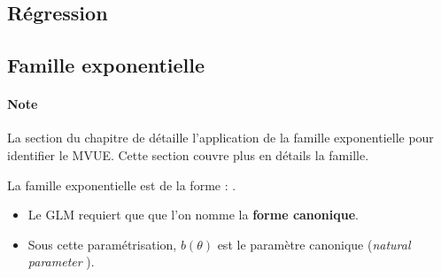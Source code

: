 \documentclass[10pt, french]{article}
\begin{document}
\begin{multicols*}{2}
%
%
%

\columnbreak
\section{Régression}
\subsection{Famille exponentielle}\label{subsec:ExpFamRegr}
\paragraph{Note}	La section \underline{\textit{}} du chapitre de \underline{\textit{}} détaille l'application de la famille exponentielle pour identifier le MVUE. Cette section couvre plus en détails la famille.


La famille exponentielle est de la forme : .
\begin{itemize}
	\item	Le GLM requiert que  que l'on nomme la \textbf{forme canonique}.
	\item	Sous cette paramétrisation, $b(\theta)$ est le paramètre canonique (\og \textit{natural parameter} \fg{}).
\end{itemize}


\end{multicols*}
\end{document}
